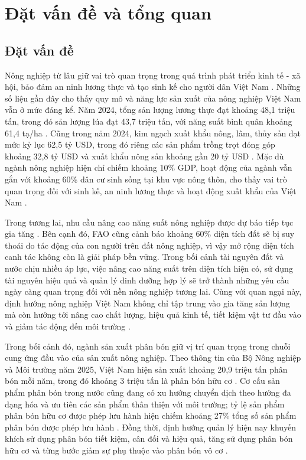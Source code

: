 \chapter{Đặt vấn đề và tổng quan}

\section{Đặt vấn đề}
Nông nghiệp từ lâu giữ vai trò quan trọng trong quá trình phát triển kinh tế - xã hội, bảo đảm an ninh lương thực và tạo sinh kế cho người dân Việt Nam \cite{world-bank-vietnam-future-jobs}. 
Những số liệu gần đây cho thấy quy mô và năng lực sản xuất của nông nghiệp Việt Nam vẫn ở mức đáng kể. 
Năm 2024, tổng sản lượng lương thực đạt khoảng 48,1 triệu tấn, trong đó sản lượng lúa đạt 43,7 triệu tấn, với năng suất bình quân khoảng 61,4 tạ/ha \cite{ppd-crop-production-79-years}. 
Cũng trong năm 2024, kim ngạch xuất khẩu nông, lâm, thủy sản đạt mức kỷ lục 62,5 tỷ USD, trong đó riêng các sản phẩm trồng trọt đóng góp khoảng 32,8 tỷ USD và xuất khẩu nông sản khoảng gần 20 tỷ USD \cite{ppd-crop-production-79-years}. 
Mặc dù ngành nông nghiệp hiện chỉ chiếm khoảng 10\% GDP, hoạt động của ngành vẫn gắn với khoảng 60\% dân cư sinh sống tại khu vực nông thôn, cho thấy vai trò quan trọng đối với sinh kế, an ninh lương thực và hoạt động xuất khẩu của Việt Nam \cite{mae-agriculture-2025}.

Trong tương lai, nhu cầu nâng cao năng suất nông nghiệp được dự báo tiếp tục gia tăng \cite{fao-land-water-2025}.
Bên cạnh đó, FAO cũng cảnh báo  khoảng 60\% diện tích đất sẽ bị suy thoái do tác động của con người trên đất nông nghiệp, vì vậy mở rộng diện tích canh tác không còn là giải pháp bền vững.\cite{fao-land-water-2025}
Trong bối cảnh tài nguyên đất và nước chịu nhiều áp lực, việc nâng cao năng suất trên diện tích hiện có, sử dụng tài nguyên hiệu quả và quản lý dinh dưỡng hợp lý sẽ trở thành những yêu cầu ngày càng quan trọng đối với nền nông nghiệp tương lai.
Cùng với quan ngại này, định hướng nông nghiệp Việt Nam không chỉ tập trung vào gia tăng sản lượng mà còn hướng tới nâng cao chất lượng, hiệu quả kinh tế, tiết kiệm vật tư đầu vào và giảm tác động đến môi trường \cite{mae-agriculture-2025}. 

Trong bối cảnh đó, ngành sản xuất phân bón giữ vị trí quan trọng trong chuỗi cung ứng đầu vào của sản xuất nông nghiệp. 
Theo thông tin của Bộ Nông nghiệp và Môi trường năm 2025, Việt Nam hiện sản xuất khoảng 20,9 triệu tấn phân bón mỗi năm, trong đó khoảng 3 triệu tấn là phân bón hữu cơ \cite{mae-fertilizer-production}. 
Cơ cấu sản phẩm phân bón trong nước cũng đang có xu hướng chuyển dịch theo hướng đa dạng hóa và ưu tiên các sản phẩm thân thiện với môi trường; tỷ lệ sản phẩm phân bón hữu cơ được phép lưu hành hiện chiếm khoảng 27\% tổng số sản phẩm phân bón được phép lưu hành \cite{mae-one-million-hectares}. 
Đồng thời, định hướng quản lý hiện nay khuyến khích sử dụng phân bón tiết kiệm, cân đối và hiệu quả, tăng sử dụng phân bón hữu cơ và từng bước giảm sự phụ thuộc vào phân bón vô cơ \cite{mae-one-million-hectares}.

